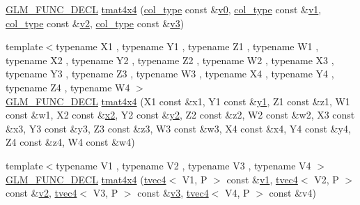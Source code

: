 \begin{DoxyCompactItemize}
\item 
\mbox{\hyperlink{setup_8hpp_ab2d052de21a70539923e9bcbf6e83a51}{G\+L\+M\+\_\+\+F\+U\+N\+C\+\_\+\+D\+E\+CL}} \mbox{\hyperlink{structglm_1_1tmat4x4_ae421bbb533f70c98920f34d135a9eb08}{tmat4x4}} (\mbox{\hyperlink{structglm_1_1tmat4x4_ac879ae9669b754551245231ee992a1ea}{col\+\_\+type}} const \&\mbox{\hyperlink{glad_8h_a7062a23d1d434121d4a88f530703d06a}{v0}}, \mbox{\hyperlink{structglm_1_1tmat4x4_ac879ae9669b754551245231ee992a1ea}{col\+\_\+type}} const \&\mbox{\hyperlink{glad_8h_a0779c3b73f9aa3a0ac5b0139b5d291d9}{v1}}, \mbox{\hyperlink{structglm_1_1tmat4x4_ac879ae9669b754551245231ee992a1ea}{col\+\_\+type}} const \&\mbox{\hyperlink{glad_8h_a9a09a1837922b2b806f4589096a52049}{v2}}, \mbox{\hyperlink{structglm_1_1tmat4x4_ac879ae9669b754551245231ee992a1ea}{col\+\_\+type}} const \&\mbox{\hyperlink{glad_8h_acc806b31cbf466ceba6555983d8b814d}{v3}})
\item 
{\footnotesize template$<$typename X1 , typename Y1 , typename Z1 , typename W1 , typename X2 , typename Y2 , typename Z2 , typename W2 , typename X3 , typename Y3 , typename Z3 , typename W3 , typename X4 , typename Y4 , typename Z4 , typename W4 $>$ }\\\mbox{\hyperlink{setup_8hpp_ab2d052de21a70539923e9bcbf6e83a51}{G\+L\+M\+\_\+\+F\+U\+N\+C\+\_\+\+D\+E\+CL}} \mbox{\hyperlink{structglm_1_1tmat4x4_a21e75b577b5e9bf7a872de8820a383b8}{tmat4x4}} (X1 const \&x1, Y1 const \&\mbox{\hyperlink{glad_8h_a48340161068d267815ac3131e9d03def}{y1}}, Z1 const \&z1, W1 const \&w1, X2 const \&\mbox{\hyperlink{glad_8h_ad2cea6eadb01f017f0d57e7edf0ce988}{x2}}, Y2 const \&\mbox{\hyperlink{glad_8h_af7158b5d27f7a6aa4ab9973fcc3a5c20}{y2}}, Z2 const \&z2, W2 const \&w2, X3 const \&x3, Y3 const \&y3, Z3 const \&z3, W3 const \&w3, X4 const \&x4, Y4 const \&y4, Z4 const \&z4, W4 const \&w4)
\item 
{\footnotesize template$<$typename V1 , typename V2 , typename V3 , typename V4 $>$ }\\\mbox{\hyperlink{setup_8hpp_ab2d052de21a70539923e9bcbf6e83a51}{G\+L\+M\+\_\+\+F\+U\+N\+C\+\_\+\+D\+E\+CL}} \mbox{\hyperlink{structglm_1_1tmat4x4_a2e88247f4e213492fc372edce3c226a2}{tmat4x4}} (\mbox{\hyperlink{structglm_1_1tvec4}{tvec4}}$<$ V1, P $>$ const \&\mbox{\hyperlink{glad_8h_a0779c3b73f9aa3a0ac5b0139b5d291d9}{v1}}, \mbox{\hyperlink{structglm_1_1tvec4}{tvec4}}$<$ V2, P $>$ const \&\mbox{\hyperlink{glad_8h_a9a09a1837922b2b806f4589096a52049}{v2}}, \mbox{\hyperlink{structglm_1_1tvec4}{tvec4}}$<$ V3, P $>$ const \&\mbox{\hyperlink{glad_8h_acc806b31cbf466ceba6555983d8b814d}{v3}}, \mbox{\hyperlink{structglm_1_1tvec4}{tvec4}}$<$ V4, P $>$ const \&v4)

\end{DoxyCompactItemize}
